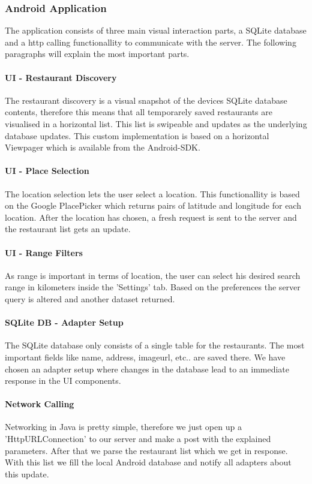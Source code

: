 \subsubsection{Android Application}

The application consists of three main visual interaction parts, a SQLite database and a http calling functionallity to communicate with the server. The following paragraphs will explain the most important parts.

\paragraph{UI - Restaurant Discovery}
The restaurant discovery is a visual snapshot of the devices SQLite database contents, therefore this means that all temporarely saved restaurants are visualised in a horizontal list. This list is swipeable and updates as the underlying database updates. This custom implementation is based on a horizontal Viewpager which is available from the Android-SDK.
\paragraph{UI - Place Selection}
The location selection lets the user select a location. This functionallity is based on the Google PlacePicker which returns pairs of latitude and longitude for each location. After the location has chosen, a fresh request is sent to the server and the restaurant list gets an update.
\paragraph{UI - Range Filters}
As range is important in terms of location, the user can select his desired search range in kilometers inside the 'Settings' tab. Based on the preferences the server query is altered and another dataset returned.
\paragraph{SQLite DB - Adapter Setup}
The SQLite database only consists of a single table for the restaurants. The most important fields like name, address, imageurl, etc.. are saved there. We have chosen an adapter setup where changes in the database lead to an immediate response in the UI components.
\paragraph{Network Calling}
Networking in Java is pretty simple, therefore we just open up a 'HttpURLConnection' to our server and make a post with the explained parameters. After that we parse the restaurant list which we get in response. With this list we fill the local Android database and notify all adapters about this update. 

